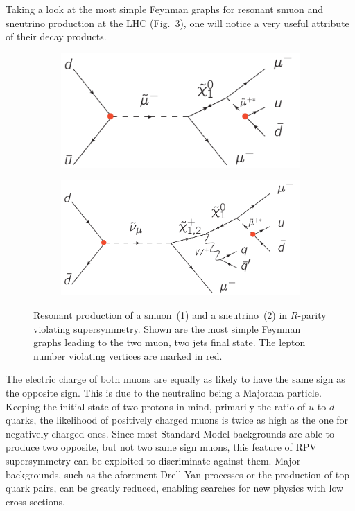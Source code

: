 Taking a look at the most simple Feynman graphs for resonant smuon and sneutrino production at the LHC (Fig.~\ref{fig:resosmusneu}), one will notice a very useful attribute of their decay products.

\begin{figure}[ht!]
  \centering
  \begin{subfigure}[b]{0.495\textwidth}
    \centering
    \includegraphics[width=\textwidth]{plots/rpv-resonant-smuon-samesign-mumuqq.pdf}
    \caption{\label{fig:ressmu}}
  \end{subfigure}
  \begin{subfigure}[b]{0.495\textwidth}
    \centering
    \includegraphics[width=\textwidth]{plots/rpv-resonant-sneutrino-chargino-mumuqq.pdf}
    \caption{\label{fig:ressneu}}
  \end{subfigure}
  \caption{Resonant production of a smuon~(\ref{fig:ressmu}) and a sneutrino~(\ref{fig:ressneu}) in $R$-parity violating supersymmetry. Shown are the most simple Feynman graphs leading to the two muon, two jets final state. The lepton number violating vertices are marked in red.}
  \label{fig:resosmusneu}
\end{figure}

\noindent The electric charge of both muons are equally as likely to have the same sign as the opposite sign. This is due to the neutralino being a Majorana particle. Keeping the initial state of two protons in mind, primarily the ratio of $u$ to $d$-quarks, the likelihood of positively charged muons is twice as high as the one for negatively charged ones. Since most Standard Model backgrounds are able to produce two opposite, but not two same sign muons, this feature of RPV supersymmetry can be exploited to discriminate against them. Major backgrounds, such as the aforement Drell-Yan processes or the production of top quark pairs, can be greatly reduced, enabling searches for new physics with low cross sections.


